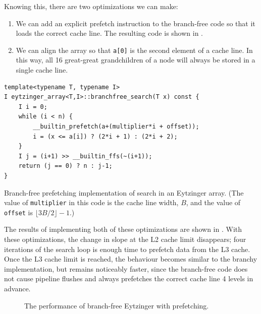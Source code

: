 \documentclass{patmorin}
\newcommand{\lstlabel}[1]{\label{lst:#1}}
\begin{document}
Knowing this, there are two optimizations we can make:
\begin{enumerate}
  \item We can add an explicit prefetch instruction to the branch-free code
    so that it loads the correct cache line.  The resulting code is shown
    in .

  \item We can align the array so that \texttt{a[0]} is the
    second element of a cache line.  In this way, all 16 great-great
    grandchildren of a node will always be stored in a single cache line.
\end{enumerate}

\begin{listing}
\begin{verbatim}
template<typename T, typename I>
I eytzinger_array<T,I>::branchfree_search(T x) const {
    I i = 0;
    while (i < n) {
        __builtin_prefetch(a+(multiplier*i + offset));
        i = (x <= a[i]) ? (2*i + 1) : (2*i + 2);
    }
    I j = (i+1) >> __builtin_ffs(~(i+1));
    return (j == 0) ? n : j-1;
}
\end{verbatim}
\caption{Branch-free prefetching implementation of search in an
         Eytzinger array. (The value of \texttt{multiplier}
         in this code is the cache line width, $B$, and the value of
         \texttt{offset} is $\lfloor3B/2\rfloor-1$.)}
\lstlabel{eytzinger-iii}
\end{listing}



The results of implementing both of these optimizations are shown in
.  With these optimizations, the change in slope
at the L2 cache limit disappears; four iterations of the search loop
is enough time to prefetch data from the L3 cache.  Once the L3 cache
limit is reached, the behaviour becomes similar to the branchy
implementation, but remains noticeably faster, since the branch-free
code does not cause pipeline flushes and always prefetches the correct
cache line 4 levels in advance.

\begin{figure}
   \caption{The performance of branch-free Eytzinger with prefetching.}
\end{figure}
\end{document}
